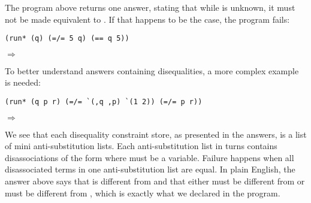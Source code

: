 The program above returns one answer, stating that while  is unknown, it must not be made equivalent to . If that happens to be the case, the program fails:
\begin{lstlisting}
(run* (q) (=/= 5 q) (== q 5))
\end{lstlisting}
$\Rightarrow$ \code{()}

To better understand answers containing disequalities, a more complex example is needed:
\begin{lstlisting}
(run* (q p r) (=/= `(,q ,p) `(1 2)) (=/= p r))
\end{lstlisting}
$\Rightarrow$

We see that each disequality constraint store, as presented in the answers, is a list of mini anti-substitution lists. Each anti-substitution list in turns contains disassociations of the form  where  must be a variable. Failure happens when all disassociated terms in one anti-substitution list are equal. In plain English, the answer above says that  is different from  and that either  must be different from  or  must be different from , which is exactly what we declared in the program.